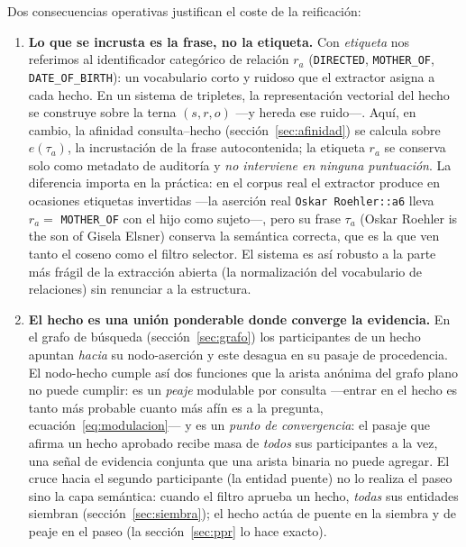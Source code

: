 \documentclass[11pt,a4paper]{article}
\begin{document}
Dos consecuencias operativas justifican el coste de la reificación:
\begin{enumerate}[leftmargin=1.5em, itemsep=1pt]
\item \textbf{Lo que se incrusta es la frase, no la etiqueta.} Con
  \emph{etiqueta} nos referimos al identificador categórico de relación
  $r_a$ (\texttt{DIRECTED}, \texttt{MOTHER\_OF}, \texttt{DATE\_OF\_BIRTH}):
  un vocabulario corto y ruidoso que el extractor asigna a cada hecho. En un
  sistema de tripletes, la representación vectorial del hecho se construye
  sobre la terna $(s,r,o)$ ---y hereda ese ruido---. Aquí, en cambio, la
  afinidad consulta--hecho (sección~\ref{sec:afinidad}) se calcula sobre
  $e(\tau_a)$, la incrustación de la frase autocontenida; la etiqueta $r_a$
  se conserva solo como metadato de auditoría y \emph{no interviene en
  ninguna puntuación}. La diferencia importa en la práctica: en el corpus
  real el extractor produce en ocasiones etiquetas invertidas ---la
  aserción real \texttt{Oskar Roehler::a6} lleva $r_a=$ \texttt{MOTHER\_OF}
  con el hijo como sujeto---, pero su frase
  $\tau_a$ (\guillemotleft{}Oskar Roehler is the son of Gisela Elsner\guillemotright{}) conserva la
  semántica correcta, que es la que ven tanto el coseno como el filtro
  selector. El sistema es así robusto a la parte más frágil de la
  extracción abierta (la normalización del vocabulario de relaciones) sin
  renunciar a la estructura.
\item \textbf{El hecho es una unión ponderable donde converge la
  evidencia.} En el grafo de búsqueda (sección~\ref{sec:grafo}) los
  participantes de un hecho apuntan \emph{hacia} su nodo-aserción y este
  desagua en su pasaje de procedencia. El nodo-hecho cumple así dos
  funciones que la arista anónima del grafo plano no puede cumplir: es un
  \emph{peaje} modulable por consulta ---entrar en el hecho es tanto más
  probable cuanto más afín es a la pregunta,
  ecuación~\ref{eq:modulacion}--- y es un \emph{punto de convergencia}: el
  pasaje que afirma un hecho aprobado recibe masa de \emph{todos} sus
  participantes a la vez, una señal de evidencia conjunta que una arista
  binaria no puede agregar. El cruce hacia el segundo participante (la
  entidad puente) no lo realiza el paseo sino la capa semántica: cuando el
  filtro aprueba un hecho, \emph{todas} sus entidades siembran
  (sección~\ref{sec:siembra}); el hecho actúa de puente en la siembra y de
  peaje en el paseo (la sección~\ref{sec:ppr} lo hace exacto).
\end{enumerate}
\end{document}
